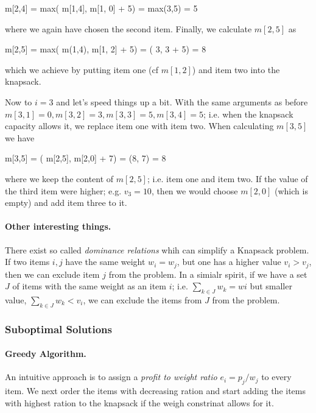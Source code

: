 \bee
m[2,4] = max( m[1,4], m[1, 0] + 5) = max(3,5) = 5
\eee

where we again have chosen the second item. Finally, we calculate $m[2,5]$ as

\bee
m[2,5] = max( m(1,4), m[1, 2] + 5) = \max( 3, 3 + 5) = 8
\eee

which we achieve by putting item one (cf $m[1,2]$) and item two into the knapsack.

Now to $i = 3$ and let's speed things up a bit. With the same arguments as before $m[3,1] = 0, m[3,2] = 3, m[3,3] = 5, m[3,4] = 5$; i.e. when the knapsack capacity allows it, we replace item one with item two. When calculating $m[3,5]$ we have

\bee
m[3,5] = \max( m[2,5], m[2,0] + 7) = \max(8, 7) = 8
\eee

where we keep the content of $m[2,5]$; i.e. item one and item two. If the value of the third item were higher; e.g. $v_3 = 10$, then we would choose $m[2,0]$ (which is empty) and add item three to it.

\paragraph{Other interesting things.} There exist so called \emph{dominance relations} whih can simplify a Knapsack problem. If two items $i, j$ have the same weight $w_i=w_j$, but one has a higher value $v_i > v_j$, then we can exclude item $j$ from the problem. In a simialr spirit, if we have a set $J$ of items with the same weight as an item $i$; i.e. $\sum_{k \in J} w_k = wi$ but smaller value, $\sum_{k \in J} w_k < v_i$, we can exclude the items from $J$ from the problem.



\subsubsection{Suboptimal Solutions}

\paragraph{Greedy Algorithm.} An intuitive approach is to assign a \emph{profit to weight ratio} $e_i = p_j / w_j$ to every item. We next order the items with decreasing ration and start adding the items with highest ration to the knapsack if the weigh constrinat allows for it.

